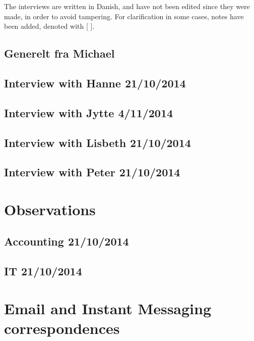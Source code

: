 The interviews are written in Danish, and have not been edited since they were made, in order to avoid tampering.
For clarification in some cases, notes have been added, denoted with [ ].

\section{Generelt fra Michael}

\section{Interview with Hanne 21/10/2014}

\section{Interview with Jytte 4/11/2014}

\section{Interview with Lisbeth 21/10/2014}

\section{Interview with Peter 21/10/2014}


\chapter{Observations}
\section{Accounting 21/10/2014}

\section{IT 21/10/2014}


\chapter{Email and Instant Messaging correspondences}
